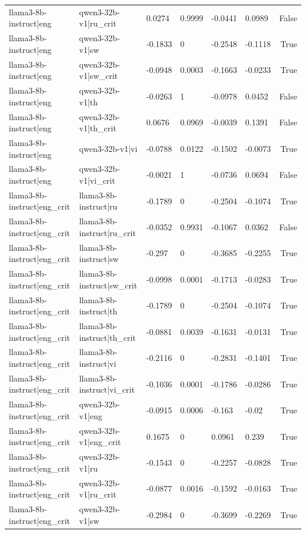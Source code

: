 \begin{table}
\begin{tabular}{llllllr}
llama3-8b-instruct|eng & qwen3-32b-v1|ru_crit & 0.0274 & 0.9999 & -0.0441 & 0.0989 & False \\
llama3-8b-instruct|eng & qwen3-32b-v1|sw & -0.1833 & 0 & -0.2548 & -0.1118 & True \\
llama3-8b-instruct|eng & qwen3-32b-v1|sw_crit & -0.0948 & 0.0003 & -0.1663 & -0.0233 & True \\
llama3-8b-instruct|eng & qwen3-32b-v1|th & -0.0263 & 1 & -0.0978 & 0.0452 & False \\
llama3-8b-instruct|eng & qwen3-32b-v1|th_crit & 0.0676 & 0.0969 & -0.0039 & 0.1391 & False \\
llama3-8b-instruct|eng & qwen3-32b-v1|vi & -0.0788 & 0.0122 & -0.1502 & -0.0073 & True \\
llama3-8b-instruct|eng & qwen3-32b-v1|vi_crit & -0.0021 & 1 & -0.0736 & 0.0694 & False \\
llama3-8b-instruct|eng_crit & llama3-8b-instruct|ru & -0.1789 & 0 & -0.2504 & -0.1074 & True \\
llama3-8b-instruct|eng_crit & llama3-8b-instruct|ru_crit & -0.0352 & 0.9931 & -0.1067 & 0.0362 & False \\
llama3-8b-instruct|eng_crit & llama3-8b-instruct|sw & -0.297 & 0 & -0.3685 & -0.2255 & True \\
llama3-8b-instruct|eng_crit & llama3-8b-instruct|sw_crit & -0.0998 & 0.0001 & -0.1713 & -0.0283 & True \\
llama3-8b-instruct|eng_crit & llama3-8b-instruct|th & -0.1789 & 0 & -0.2504 & -0.1074 & True \\
llama3-8b-instruct|eng_crit & llama3-8b-instruct|th_crit & -0.0881 & 0.0039 & -0.1631 & -0.0131 & True \\
llama3-8b-instruct|eng_crit & llama3-8b-instruct|vi & -0.2116 & 0 & -0.2831 & -0.1401 & True \\
llama3-8b-instruct|eng_crit & llama3-8b-instruct|vi_crit & -0.1036 & 0.0001 & -0.1786 & -0.0286 & True \\
llama3-8b-instruct|eng_crit & qwen3-32b-v1|eng & -0.0915 & 0.0006 & -0.163 & -0.02 & True \\
llama3-8b-instruct|eng_crit & qwen3-32b-v1|eng_crit & 0.1675 & 0 & 0.0961 & 0.239 & True \\
llama3-8b-instruct|eng_crit & qwen3-32b-v1|ru & -0.1543 & 0 & -0.2257 & -0.0828 & True \\
llama3-8b-instruct|eng_crit & qwen3-32b-v1|ru_crit & -0.0877 & 0.0016 & -0.1592 & -0.0163 & True \\
llama3-8b-instruct|eng_crit & qwen3-32b-v1|sw & -0.2984 & 0 & -0.3699 & -0.2269 & True \\

\end{tabular}
\end{table}
